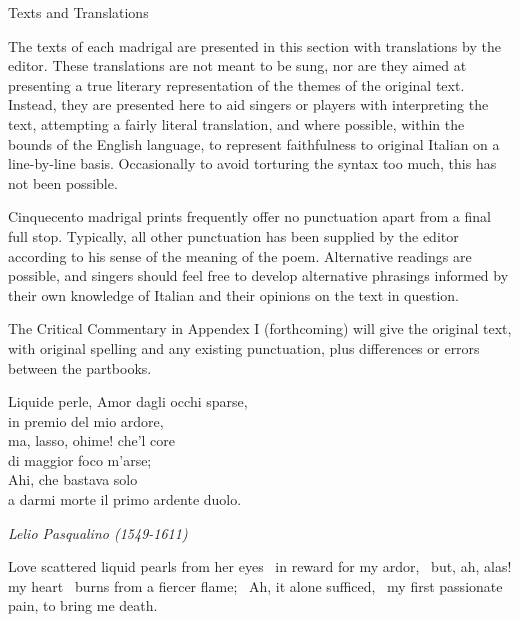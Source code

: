 \documentclass[12pt, twocolumn]{text-translation}
\begin{document}
\clearpage
\onecolumn
\vspace*{\fill}
\begin{center}
    \Huge Texts and Translations
\end{center}
\vspace*{\fill}

\twocolumn

\noindentation
The texts of each madrigal are presented in this section with translations
by the editor. These translations are not meant to be sung, nor are they
aimed at presenting a true literary representation of the themes of the
original text. Instead, they are presented here to aid singers or players
with interpreting the text, attempting a fairly literal translation, and
where possible, within the bounds of the English language, to represent
faithfulness to original Italian on a line-by-line basis. Occasionally to
avoid torturing the syntax too much, this has not been possible.

\indented
Cinquecento madrigal prints frequently offer no punctuation apart from a final
full stop. Typically, all other punctuation has been supplied by the editor
according to his sense of the meaning of the poem. Alternative readings are
possible, and singers should feel free to develop alternative phrasings
informed by their own knowledge of Italian and their opinions on the text
in question.

\indented
The Critical Commentary in Appendex I (forthcoming) will give the original text, with
original spelling and any existing punctuation, plus differences or errors
between the partbooks.


Liquide perle, Amor dagli occhi sparse, \\
in premio del mio ardore, \\
ma, lasso, ohime! che'l core \\
di maggior foco m'arse; \\
Ahi, che bastava solo \\
a darmi morte il primo ardente duolo.

{\raggedleft \textit{Lelio Pasqualino (1549-1611)}\par}
\poemasterisks
Love scattered liquid pearls from her eyes \
in reward for my ardor, \
but, ah, alas! my heart \
burns from a fiercer flame; \
Ah, it alone sufficed, \
my first passionate pain, to bring me death.
\end{document}

